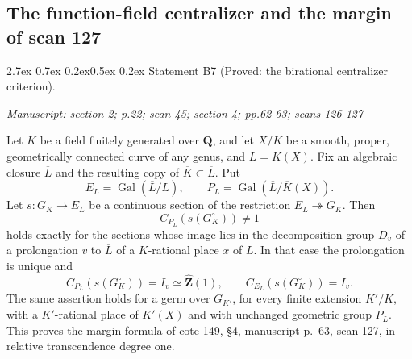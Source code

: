 \documentclass[11pt,a4paper]{article}
\makeatletter
\newcommand{\passage}[1]{\par\smallskip\noindent\textit{Manuscript: #1}\par\smallskip}
\renewcommand\paragraph{\@startsection{paragraph}{4}{\z@}%
  {2.7ex \@plus 0.7ex \@minus 0.2ex}{0.5ex \@plus 0.2ex}%
  {\normalfont\normalsize\bfseries}}
\makeatother
\begin{document}


\subsection{The function-field centralizer and the margin of scan 127}

\paragraph{Statement B7 (Proved: the birational centralizer criterion).}\label{res:B7}
\passage{section 2; p.22; scan 45; section 4; pp.62-63; scans 126-127}

Let $K$ be a field finitely generated over $\mathbf Q$, and let $X/K$ be a smooth, proper, geometrically connected
curve of any genus, and $L=K(X)$. Fix an algebraic closure $\overline L$
and the resulting copy of $\overline K\subset\overline L$. Put
\[
 E_L=\operatorname{Gal}(\overline L/L),\qquad
 P_L=\operatorname{Gal}(\overline L/\overline K(X)).
\]
Let $s:G_K\to E_L$ be a continuous section of the restriction
$E_L\twoheadrightarrow G_K$. Then
\[
 C_{P_L}(s(G_K^\circ))\ne1
\]
holds exactly for the sections whose image lies in the decomposition
group $D_v$ of a prolongation $v$ to $\overline L$ of a $K$-rational place
$x$ of $L$. In that case the prolongation is unique and
\[
 C_{P_L}(s(G_K^\circ))=I_v\simeq\widehat{\mathbf Z}(1),\qquad
 C_{E_L}(s(G_K^\circ))=I_v.
\]
The same assertion holds for a germ over $G_{K'}$, for every finite
extension $K'/K$, with a $K'$-rational place of $K'(X)$ and with unchanged
geometric group $P_L$. This proves the margin formula of cote 149,
\S4, manuscript p.~63, scan 127, in relative transcendence degree one.
\end{document}
